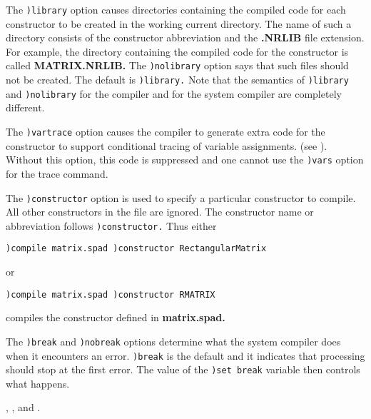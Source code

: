 The {\tt )library} option causes directories containing the
compiled code for each constructor
to be created in the working current directory.
The name of such a directory consists of the constructor
abbreviation and the {\bf .NRLIB} file extension.
For example, the directory containing the compiled code for
the  constructor is called {\bf MATRIX.NRLIB.}
The {\tt )nolibrary} option says that such files should not
be created.
The default is {\tt )library.}
Note that the semantics of {\tt )library} and {\tt )nolibrary}
for the \aldor{} compiler and for the \Language{} system compiler are
completely different.

The {\tt )vartrace} option causes the compiler to generate
extra code for the constructor to support conditional tracing of
variable assignments. (see ). Without
this option, this code is suppressed and one cannot use
the {\tt )vars} option for the trace command.

The {\tt )constructor} option is used to
specify a particular constructor to compile.
All other constructors in the file are ignored.
The constructor name or abbreviation follows {\tt )constructor.}
Thus either
\begin{verbatim}
)compile matrix.spad )constructor RectangularMatrix
\end{verbatim}
or
\begin{verbatim}
)compile matrix.spad )constructor RMATRIX
\end{verbatim}
compiles  the  constructor
defined in {\bf matrix.spad.}

The {\tt )break} and {\tt )nobreak} options determine what
the \Language system compiler does when it encounters an error.
{\tt )break} is the default and it indicates that processing
should stop at the first error.
The value of the {\tt )set break} variable then controls what happens.



\par{}
,
, and
.


